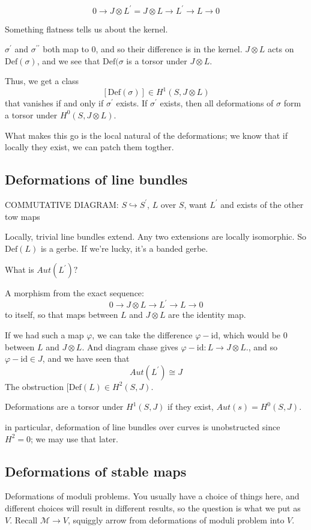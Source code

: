 \documentclass{amsart}
\theoremstyle{definition}
\newcommand{\Def}{\text{Def}}
\newcommand{\M}{\mathcal{M}}
\newcommand{\Aut}{Aut}
\begin{document}
$$0\to J\otimes L^\prime=J\otimes L\to L^\prime\to L\to 0$$

Something flatness tells us about the kernel.

$\sigma^\prime$ and $\sigma^{\prime\prime}$ both map to $0$, and so their difference is in the kernel.  $J\otimes L$ acts on $\text{Def}(\sigma)$, and we see that $\text{Def}(\sigma$ is a torsor under $J\otimes L$.

Thus, we get a class 
$$[\text{Def}(\sigma)]\in H^1(S, J\otimes L)$$
that vanishes if and only if $\sigma^\prime$ exists.  If $\sigma^\prime$ exists, then all deformations of $\sigma$ form a torsor under $H^0(S, J\otimes L)$.

What makes this go is the local natural of the deformations; we know that if locally they exist, we can patch them togther.

\subsection{Deformations of line bundles}

COMMUTATIVE DIAGRAM: $S\hookrightarrow S^\prime$, $L$ over  $S$, want $L^\prime$ and exists of the other tow maps

Locally, trivial line bundles extend.  Any two extensions are locally isomorphic.  So $\Def(L)$ is a gerbe.  If we're lucky, it's a banded gerbe.

What is $\Aut(L^\prime)?$

A morphism from the exact sequence:
$$0\to J\otimes L\to L^\prime\to L\to 0$$
to itself, so that 
maps between $L$ and $J\otimes L$ are the identity map.

If we had such a map $\varphi$, we can take the difference $\varphi-\text{id}$, which would be $0$ between $L$ and $J\otimes L$.  And diagram chase gives $\varphi-\text{id}:L\to J\otimes L$., and so $\varphi-\text{id}\in J$, and we have seen that
$$\Aut(L^\prime)\cong J$$
The obstruction $[\Def(L)\in H^2(S, J)$.

Deformations are a torsor under $H^1(S, J)$ if they exist, $\Aut(s)=H^0(S, J)$.

in particular, deformation of line bundles over curves is unobstructed since $H^2=0$; we may use that later.
\subsection{Deformations of stable maps}
Deformations of moduli problems.  You usually have a choice of things here, and different choices will result in different results, so the question is what we put as $V$.
Recall $\M\to V$, squiggly arrow from deformations of moduli problem into $V$.
\end{document}
